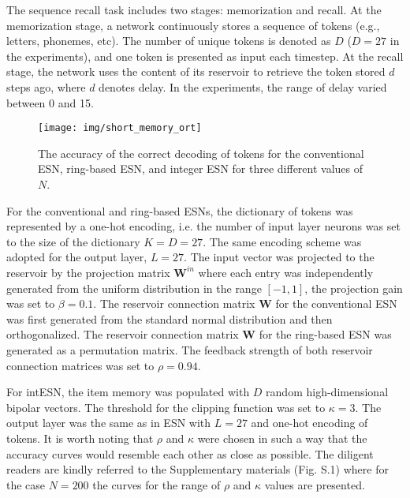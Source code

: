 The sequence recall task includes  two stages: memorization and recall.
At the memorization stage,  a network continuously stores a sequence of tokens 
(e.g., letters, phonemes, etc).
The number of unique tokens is denoted as $D$ ($D=27$ in the experiments), and one token is presented as input each timestep.
At the recall stage, the network uses the content of its reservoir to
retrieve the token stored $d$ steps ago, where $d$ denotes delay. In the
experiments, the range of delay varied between 0 and 15.



\begin{figure}[tb]%
\centering
\texttt{[image: img/short\_memory\_ort]}
\caption{The accuracy of the  correct decoding of tokens for the conventional ESN, ring-based ESN, and integer ESN for
three different values of $N$.
}
\label{fig:memory}
\end{figure}




For the conventional and ring-based ESNs, the  dictionary of tokens was represented by a one-hot encoding, i.e.
the number of input layer neurons was set to the  size of the dictionary
$K=D=27$. The same encoding scheme was adopted for the output layer, $L=27$.
The input vector  was projected to the reservoir by the projection matrix
$\textbf{W}^{in}$ where each entry was independently generated from the uniform distribution in the
range $[-1,1]$, the projection gain was set to $\beta=0.1$.  
The reservoir connection matrix $\textbf{W}$ for the conventional ESN  was first generated from the standard normal distribution and then orthogonalized. 
The reservoir connection matrix $\textbf{W}$ for the ring-based ESN  was generated as a permutation matrix. 
The feedback strength of both reservoir connection matrices was set to $\rho=0.94$. 


For intESN, the item memory was populated with $D$ random high-dimensional
bipolar vectors.  The threshold for the clipping function was set to $\kappa=3$. The
output layer was the same as in ESN with $L=27$ and one-hot encoding of tokens.
It is worth noting that $\rho$ and $\kappa$ were chosen in such a way that the accuracy curves would resemble each other as close as possible. 
The diligent readers are kindly referred to the Supplementary materials (Fig. S.1) where for the case $N=200$ the curves for the range of $\rho$ and $\kappa$ values are presented. 



